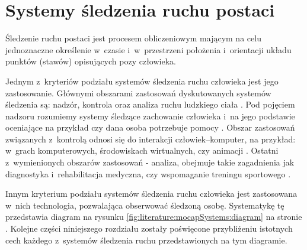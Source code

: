 \section{Systemy śledzenia ruchu postaci} \label{sec:literature:mocapSystems}

Śledzenie ruchu postaci jest procesem obliczeniowym mającym na celu jednoznaczne określenie w~czasie i~w~przestrzeni położenia i~orientacji układu punktów (stawów) opisujących pozy człowieka. 

Jednym z~kryteriów podziału systemów śledzenia ruchu człowieka jest jego zastosowanie. Głównymi obszarami zastosowań dyskutowanych systemów śledzenia są: nadzór, kontrola oraz analiza ruchu ludzkiego ciała \cite{Moeslund2001}. Pod pojęciem nadzoru rozumiemy systemy śledzące zachowanie człowieka i~na jego podstawie oceniające na przykład czy dana osoba potrzebuje pomocy \cite{Kwolek, Kepski2016, Haritaoglu}. Obszar zastosowań związanych z~kontrolą odnosi się do interakcji człowiek--komputer, na przykład: w~grach komputerowych, środowiskach wirtualnych, czy animacji \cite{Moeslund2001a}. Ostatni z~wymienionych obszarów zastosowań - analiza, obejmuje takie zagadnienia jak diagnostyka i~rehabilitacja medyczna{}, czy wspomaganie treningu sportowego \cite{Neville2010,Noiumkar2013}.

Innym kryterium podziału systemów śledzenia ruchu człowieka jest zastosowana w~nich technologia, pozwalająca obserwować śledzoną osobę. Systematykę tę przedstawia diagram na rysunku \ref{fig:literature:mocapSystems:diagram} na stronie \pageref{fig:literature:mocapSystems:diagram}. Kolejne części niniejszego rozdziału zostały poświęcone przybliżeniu istotnych cech każdego z~systemów śledzenia ruchu przedstawionych na tym diagramie.

